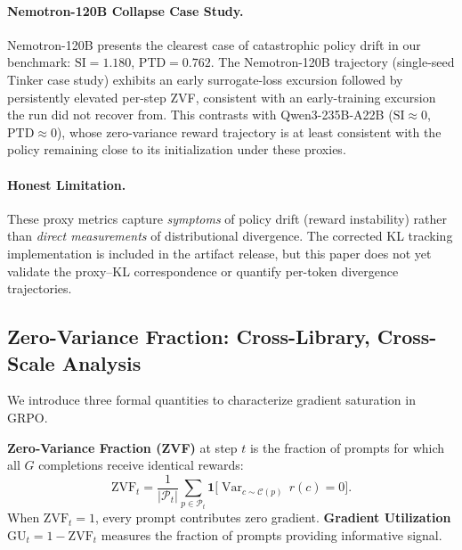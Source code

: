 \documentclass{article}
\begin{document}
\paragraph{Nemotron-120B Collapse Case Study.}
Nemotron-120B presents the clearest case of catastrophic policy drift
in our benchmark: $\text{SI} = 1.180$, $\text{PTD} = 0.762$.
The Nemotron-120B trajectory (single-seed Tinker case study)
exhibits an early surrogate-loss excursion followed by persistently elevated
per-step ZVF, consistent with an early-training excursion the run
did not recover from. This contrasts with Qwen3-235B-A22B
($\text{SI} \approx 0$, $\text{PTD} \approx 0$), whose zero-variance reward
trajectory is at least consistent with the policy remaining close to its
initialization under these proxies.

\paragraph{Honest Limitation.}
These proxy metrics capture \emph{symptoms} of policy drift (reward
instability) rather than \emph{direct measurements} of distributional
divergence. The corrected KL tracking implementation is included in the
artifact release, but this paper does not yet validate the proxy--KL
correspondence or quantify per-token divergence trajectories.

\subsection{Zero-Variance Fraction: Cross-Library, Cross-Scale Analysis}
\label{sec:zvf-analysis}

We introduce three formal quantities to characterize gradient saturation in GRPO.

\textbf{Zero-Variance Fraction (ZVF)} at step $t$ is the fraction of prompts
for which all $G$ completions receive identical rewards:
\[
  \mathrm{ZVF}_t = \frac{1}{|\mathcal{P}_t|}\sum_{p \in \mathcal{P}_t}
  \mathbf{1}\bigl[\operatorname{Var}_{c \sim \mathcal{C}(p)}\,r(c) = 0\bigr].
\]
When $\mathrm{ZVF}_t = 1$, every prompt contributes zero gradient.
\textbf{Gradient Utilization} $\mathrm{GU}_t = 1 - \mathrm{ZVF}_t$ measures
the fraction of prompts providing informative signal.
\end{document}
